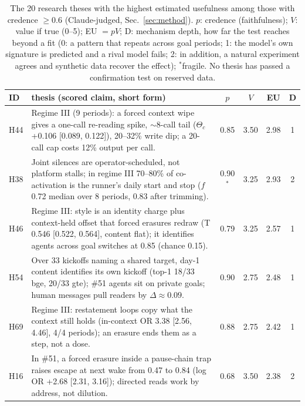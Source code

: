 \begin{table}[!h]
\caption{The 20 research theses with the highest estimated usefulness among those with credence $\geq 0.6$ (Claude-judged, Sec.~\ref{sec:method}). $p$: credence (faithfulness); $V$: value if true (0--5); EU $=pV$; D: mechanism depth, how far the test reaches beyond a fit (0: a pattern that repeats across goal periods; 1: the model's own signature is predicted and a rival model fails; 2: in addition, a natural experiment agrees and synthetic data recover the effect); $^\ast$fragile. No thesis has passed a confirmation test on reserved data.}
\label{tab:theses}
\scriptsize\renewcommand{\arraystretch}{1.05}
\begin{tabular}{@{}l p{} c c c c@{}}
\toprule
ID & thesis (scored claim, short form) & $p$ & $V$ & EU & D\\ \midrule
H44 & Regime III (9 periods): a forced context wipe gives a one-call re-reading spike, $\sim$8-call tail ($\Theta_c$ +0.106 [0.089, 0.122]), 20--32\% write dip; a 20-call cap costs 12\% output per call. & 0.85 & 3.50 & 2.98 & 1\\
H38 & Joint silences are operator-scheduled, not platform stalls; in regime III 70--80\% of co-activation is the runner's daily start and stop ($f$ 0.72 median over 8 periods, 0.83 after trimming). & 0.90$^\ast$ & 3.25 & 2.93 & 2\\
H46 & Regime III: style is an identity charge plus context-held offset that forced erasures redraw (T 0.546 [0.522, 0.564], content flat); it identifies agents across goal switches at 0.85 (chance 0.15). & 0.79 & 3.25 & 2.57 & 1\\
H54 & Over 33 kickoffs naming a shared target, day-1 content identifies its own kickoff (top-1 18/33 bge, 20/33 gte); \#51 agents sit on private goals; human messages pull readers by $\Delta\approx 0.09$. & 0.90 & 2.75 & 2.48 & 1\\
H69 & Regime III: restatement loops copy what the context still holds (in-context OR 3.38 [2.56, 4.46], 4/4 periods); an erasure ends them as a step, not a dose. & 0.88 & 2.75 & 2.42 & 1\\
H16 & In \#51, a forced erasure inside a pause-chain trap raises escape at next wake from 0.47 to 0.84 (log OR +2.68 [2.31, 3.16]); directed reads work by address, not dilution. & 0.68 & 3.50 & 2.38 & 2\\

\end{tabular}
\end{table}
